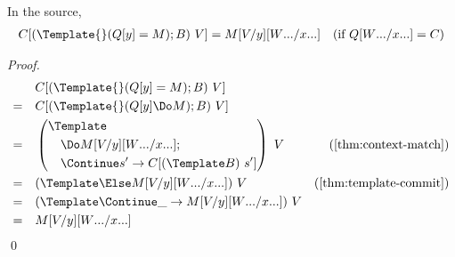 \begin{lemma}
  \label{thm:context-exact-match}
  In the source,
  \begin{align*}
    C[(\Template{} (Q[y] = M); B) ~ V]
    &=
    M\subst{y}{V}\subst{\many{x}}{\many{W}}
    &(\text{if } Q\subst{\many{x}}{\many{W}} = C)
  \end{align*}
\end{lemma}
\begin{proof}
  \begin{align*}
    &\quad
    C[(\Template{} (Q[y] = M); B) ~ V]
    \\
    =&\quad
    C[(\Template{} (Q[y] \Do M); B) ~ V]
    \\
    =&\quad
    \left(
      \begin{aligned}
        &\Template \\
        &\quad \Do M\subst{y}{V}\subst{\many{x}}{\many{W}}; \\
        &\quad \Continue s' \to C[(\Template B) ~ s']
      \end{aligned}
    \right)
    ~ V
    &(\cref{thm:context-match})
    \\
    =&\quad
    (\Template \Else M\subst{y}{V}\subst{\many{x}}{\many{W}}) ~ V
    &(\cref{thm:template-commit})
    \\
    =&\quad
    (\Template \Continue \_ \to  M\subst{y}{V}\subst{\many{x}}{\many{W}}) ~ V
    \\
    =&\quad
    M\subst{y}{V}\subst{\many{x}}{\many{W}}
  \end{align*}
  \qed
  

\end{proof}
